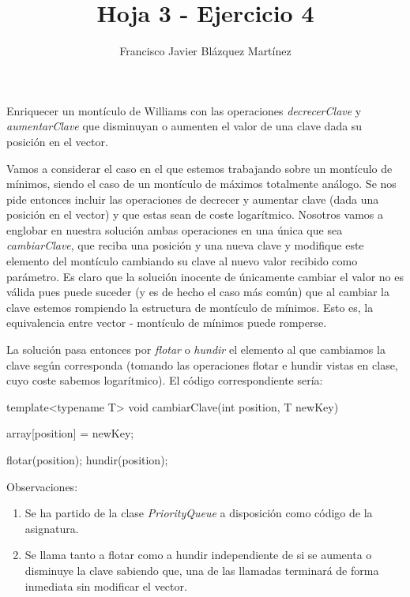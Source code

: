 \documentclass[12pt]{article}
\newenvironment{problem}[2][Problema]{\begin{trivlist}
\item[\hskip \labelsep {\bfseries #1}\hskip \labelsep {\bfseries #2.}]}{\end{trivlist}}
\begin{document}
 
\title{\textbf{Hoja 3 - Ejercicio 4}}
\author{Francisco Javier Blázquez Martínez}
\date{}
\maketitle
 
\begin{problem}{3.4}
Enriquecer un montículo de Williams con las operaciones \textit{decrecerClave} y 
\textit{aumentarClave} que disminuyan o aumenten el valor de una clave dada su
posición en el vector.
\end{problem}

Vamos a considerar el caso en el que estemos trabajando sobre un montículo de mínimos,
siendo el caso de un montículo de máximos totalmente análogo. Se nos pide entonces
incluir las operaciones de decrecer y aumentar clave (dada una posición en el vector)
y que estas sean de coste logarítmico. Nosotros vamos a englobar en nuestra solución
ambas operaciones en una única que sea \textit{cambiarClave}, que reciba una posición
y una nueva clave y modifique este elemento del montículo cambiando su clave al nuevo
valor recibido como parámetro. Es claro que la solución inocente de únicamente cambiar
el valor no es válida pues puede suceder (y es de hecho el caso más común) que al 
cambiar la clave estemos rompiendo la estructura de montículo de mínimos. Esto es, la
equivalencia entre vector - montículo de mínimos puede romperse. 

La solución pasa entonces por \textit{flotar} o \textit{hundir} el elemento al que
cambiamos la clave según corresponda (tomando las operaciones flotar e hundir vistas
en clase, cuyo coste sabemos logarítmico). El código correspondiente sería:

\begin{listing}
 template<typename T>
 void cambiarClave(int position, T newKey)
 {
    array[position] = newKey;
    
    flotar(position);
    hundir(position);
 }
\end{listing}
 
 \setlength{\parskip}{0mm} 
 Observaciones:
 
\begin{enumerate}
    \item Se ha partido de la clase \textit{PriorityQueue} a disposición como código
          de la asignatura.
    \item Se llama tanto a flotar como a hundir independiente de si se aumenta o 
          disminuye la clave sabiendo que, una de las llamadas terminará de forma
          inmediata sin modificar el vector.
\end{enumerate}
 
\end{document}
